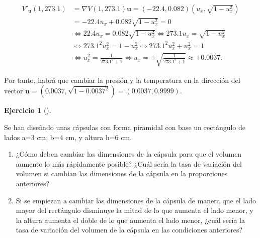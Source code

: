 \documentclass[
  a4paper,
]{scrreport}
\theoremstyle{definition}
\newtheorem{exercise}{Ejercicio}[chapter]
\theoremstyle{remark}
\begin{document}
\begin{tcolorbox}
\begin{enumerate}
  \begin{align*}
  V'_{\mathbf{u}}(1,273.1) 
  &= \nabla V(1, 273.1) \mathbf{u}
  = (-22.4, 0.082)(u_x,\sqrt{1-u_x^2}) \\ 
  &= -22.4 u_x + 0.082 \sqrt{1-u_x^2}
  = 0 \\
  &\Leftrightarrow 22.4 u_x = 0.082\sqrt{1-u_x^2}
  \Leftrightarrow 273.1 u_x = \sqrt{1-u_x^2} \\
  &\Leftrightarrow 273.1^2 u_x^2 = 1-u_x^2 
  \Leftrightarrow 273.1^2 u_x^2 + u_x^2 = 1 \\ 
  &\Leftrightarrow u_x^2 = \frac{1}{273.1^2+1}
  \Leftrightarrow u_x = \pm \sqrt{\frac{1}{273.1^2+1}}
  \approx \pm 0.0037.
  \end{align*}
\end{enumerate}

Por tanto, habrá que cambiar la presión y la temperatura en la dirección
del vector
\(\mathbf{u}=(0.0037, \sqrt{1-0.0037^2}) = (0.0037, 0.9999)\).

\end{tcolorbox}

\begin{exercise}[]\protect\hypertarget{exr-derivada-direccional-capsulas}{}\label{exr-derivada-direccional-capsulas}

Se han diseñado unas cápsulas con forma piramidal con base un rectángulo
de lados a=3 cm, b=4 cm, y altura h=6 cm.

\begin{enumerate}
\def\labelenumi{\alph{enumi}.}
\item
  ¿Cómo deben cambiar las dimensiones de la cápsula para que el volumen
  aumente lo más rápidamente posible? ¿Cuál sería la tasa de variación
  del volumen si cambian las dimensiones de la cápsula en la
  proporciones anteriores?
\item
  Si se empiezan a cambiar las dimensiones de la cápsula de manera que
  el lado mayor del rectángulo disminuye la mitad de lo que aumenta el
  lado menor, y la altura aumenta el doble de lo que aumenta el lado
  menor, ¿cuál sería la tasa de variación del volumen de la cápsula en
  las condiciones anteriores?
\end{enumerate}

\end{exercise}
\end{document}
